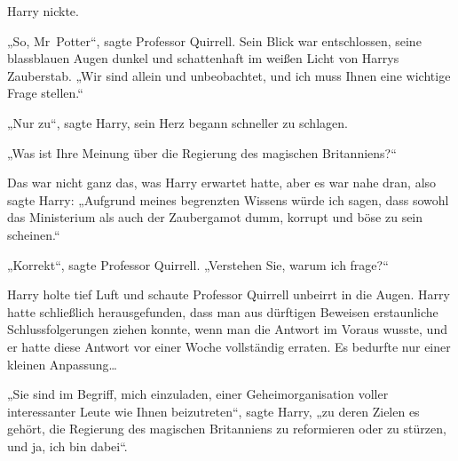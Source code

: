 Harry nickte.

„So, Mr~Potter“, sagte Professor Quirrell. Sein Blick war entschlossen, seine blassblauen Augen dunkel und schattenhaft im weißen Licht von Harrys Zauberstab. „Wir sind allein und unbeobachtet, und ich muss Ihnen eine wichtige Frage stellen.“

„Nur zu“, sagte Harry, sein Herz begann schneller zu schlagen.

„Was ist Ihre Meinung über die Regierung des magischen Britanniens?“

Das war nicht ganz das, was Harry erwartet hatte, aber es war nahe dran, also sagte Harry: „Aufgrund meines begrenzten Wissens würde ich sagen, dass sowohl das Ministerium als auch der Zaubergamot dumm, korrupt und böse zu sein scheinen.“

„Korrekt“, sagte Professor Quirrell. „Verstehen Sie, warum ich frage?“

Harry holte tief Luft und schaute Professor Quirrell unbeirrt in die Augen. Harry hatte schließlich herausgefunden, dass man aus dürftigen Beweisen erstaunliche Schlussfolgerungen ziehen konnte, wenn man die Antwort im Voraus wusste, und er hatte diese Antwort vor einer Woche vollständig erraten. Es bedurfte nur einer kleinen Anpassung…

„Sie sind im Begriff, mich einzuladen, einer Geheimorganisation voller interessanter Leute wie Ihnen beizutreten“, sagte Harry, „zu deren Zielen es gehört, die Regierung des magischen Britanniens zu reformieren oder zu stürzen, und ja, ich bin dabei“.

